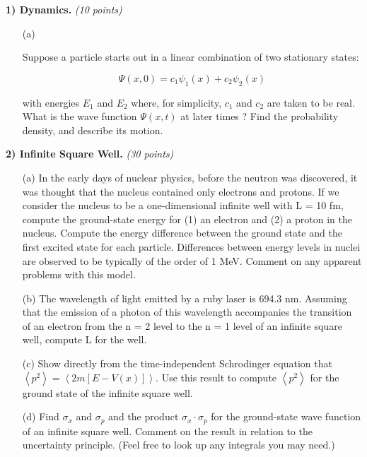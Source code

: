 {\large


\textbf{1) Dynamics. }\hfill \textit{(10 points)}
\begin{itemize}
\item[(a)]{ 
Suppose a particle starts out in a linear combination of two stationary states: 

\begin{equation}
\Psi(x,0) = c_1 \psi_1(x) + c_2 \psi_2(x)
\end{equation}

with energies $E_1$ and $E_2$ where, for simplicity,  $c_1$ and $c_2$ are taken to be real.
What is the wave function $\Psi(x,t)$ at later times ?
Find the probability density, and describe its motion.
}
\end{itemize}

\vspace*{0.4in}

\textbf{2) Infinite Square Well. }\hfill \textit{(30 points)}
\begin{itemize}
\item[(a)]{
In the early days of nuclear physics, before the neutron was discovered, it was thought that the nucleus contained only electrons and protons. 
If we consider the nucleus to be a one-dimensional infinite well with L = 10 fm, compute the ground-state energy for (1) an electron and (2) a proton in the nucleus. 
Compute the energy difference between the ground state and the first excited state for each particle.
Differences between energy levels in nuclei are observed to be typically of the order of 1 MeV.
Comment on any apparent problems with this model.
}
\item[(b)]{
The wavelength of light emitted by a ruby laser is 694.3 nm.
Assuming that the emission of a photon of this wavelength accompanies the transition of an electron from the n = 2 level to the n = 1 level of an infinite square well, compute L for the well.
}
\item[(c)]{
Show directly from the time-independent Schrodinger equation that $\left<p^2\right> = \left<2m[E - V(x)]\right>$. 
Use this result to compute $\left<p^2\right>$ for the ground state of the infinite square well.
}
\item[(d)]{
Find $\sigma_x$ and $\sigma_p$ and the product $\sigma_x\cdot\sigma_p$ for the ground-state wave function of an infinite square well.
Comment on the result in relation to the uncertainty principle. 
(Feel free to look up any integrals you may need.)
}

\end{itemize}

}
